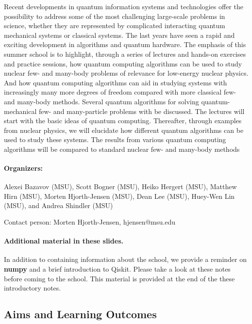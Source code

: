 \documentclass[%
oneside,                 %
final,                   %
10pt]{article}
\begin{document}
Recent developments in quantum information systems and technologies
offer the possibility to address some of the most challenging
large-scale problems in science, whether they are represented by
complicated interacting quantum mechanical systems or classical
systems. The last years have seen a rapid and exciting development in
algorithms and quantum hardware.  The emphasis of this summer school
is to highlight, through a series of lectures and hands-on exercises
and practice sessions, how quantum computing algorithms can be used to
study nuclear few- and many-body problems of relevance for low-energy
nuclear physics.  And how quantum computing algorithms can aid in
studying systems with increasingly many more degrees of freedom
compared with more classical few- and many-body methods.  Several
quantum algorithms for solving quantum-mechanical few- and
many-particle problems with be discussed.  The lectures will start
with the basic ideas of quantum computing. Thereafter, through
examples from nuclear physics, we will elucidate how different quantum
algorithms can be used to study these systems. The results from
various quantum computing algorithms will be compared to standard
nuclear few- and many-body methods 

\paragraph{Organizers:}
Alexei Bazavov (MSU), Scott Bogner (MSU), Heiko Hergert (MSU), Matthew Hirn (MSU), Morten Hjorth-Jensen (MSU), Dean Lee (MSU), Huey-Wen Lin (MSU), and Andrea Shindler (MSU)

Contact person: Morten Hjorth-Jensen, hjensen@msu.edu

\paragraph{Additional material in these slides.}
In addition to containing information about the school, we provide a reminder on \textbf{numpy} and a brief introduction to Qiskit. Please take a look at these notes before coming to the school. This material is provided at the end of the these introductory notes.

\subsection{Aims and Learning Outcomes}
\end{document}

